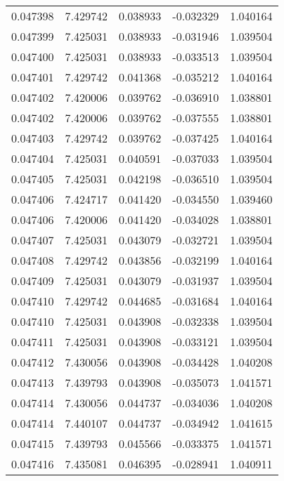 \begin{tabular}{lrrrr}
0.047398    &  7.429742 &  0.038933 & -0.032329 &             1.040164 \\
0.047399    &  7.425031 &  0.038933 & -0.031946 &             1.039504 \\
0.047400    &  7.425031 &  0.038933 & -0.033513 &             1.039504 \\
0.047401    &  7.429742 &  0.041368 & -0.035212 &             1.040164 \\
0.047402    &  7.420006 &  0.039762 & -0.036910 &             1.038801 \\
0.047402    &  7.420006 &  0.039762 & -0.037555 &             1.038801 \\
0.047403    &  7.429742 &  0.039762 & -0.037425 &             1.040164 \\
0.047404    &  7.425031 &  0.040591 & -0.037033 &             1.039504 \\
0.047405    &  7.425031 &  0.042198 & -0.036510 &             1.039504 \\
0.047406    &  7.424717 &  0.041420 & -0.034550 &             1.039460 \\
0.047406    &  7.420006 &  0.041420 & -0.034028 &             1.038801 \\
0.047407    &  7.425031 &  0.043079 & -0.032721 &             1.039504 \\
0.047408    &  7.429742 &  0.043856 & -0.032199 &             1.040164 \\
0.047409    &  7.425031 &  0.043079 & -0.031937 &             1.039504 \\
0.047410    &  7.429742 &  0.044685 & -0.031684 &             1.040164 \\
0.047410    &  7.425031 &  0.043908 & -0.032338 &             1.039504 \\
0.047411    &  7.425031 &  0.043908 & -0.033121 &             1.039504 \\
0.047412    &  7.430056 &  0.043908 & -0.034428 &             1.040208 \\
0.047413    &  7.439793 &  0.043908 & -0.035073 &             1.041571 \\
0.047414    &  7.430056 &  0.044737 & -0.034036 &             1.040208 \\
0.047414    &  7.440107 &  0.044737 & -0.034942 &             1.041615 \\
0.047415    &  7.439793 &  0.045566 & -0.033375 &             1.041571 \\
0.047416    &  7.435081 &  0.046395 & -0.028941 &             1.040911 \\

\end{tabular}
